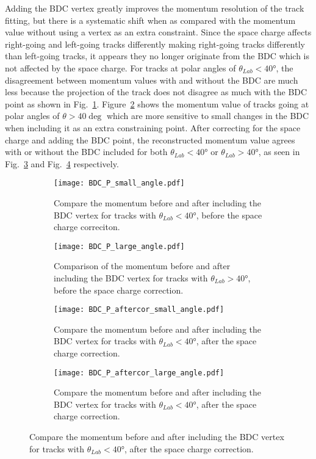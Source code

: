 Adding the BDC vertex greatly improves the momentum resolution of the track fitting, but there is a systematic shift when as compared with the momentum value without using a vertex as an extra constraint. Since the space charge affects right-going and left-going tracks differently making right-going tracks differently than left-going tracks, it appears they no longer originate from the BDC which is not affected by the space charge. For tracks at polar angles of $\theta_{Lab} < \ang{40}$, the disagreement between momentum values with and without the BDC are much less because the projection of the track does not disagree as much with the BDC point as shown in Fig.~\ref{fig:mom_S_before}. Figure~\ref{fig:mom_L_before} shows the momentum value of tracks going at polar angles of $\theta > 40 \deg$ which are more sensitive to small changes in the BDC when including it as an extra constraining point. After correcting for the space charge and adding the BDC point, the reconstructed momentum value agrees with or without the BDC included for both  $\theta_{Lab} < \ang{40}$ or $\theta_{Lab} > \ang{40}$, as seen in Fig.~\ref{fig:mom_S_after} and Fig.~\ref{fig:mom_L_after} respectively. 


\begin{figure}[!htb]
    \centering
    \begin{subfigure}[t]{0.45\textwidth}
        \centering
        \texttt{[image: BDC\_P\_small\_angle.pdf]} 
        \caption{Compare the momentum before and after including the BDC vertex for tracks with $\theta_{Lab} < \ang{40}$, before the space charge correciton.} \label{fig:mom_S_before}
    \end{subfigure}
    \hfill
    \begin{subfigure}[t]{0.45\textwidth}
        \centering
        \texttt{[image: BDC\_P\_large\_angle.pdf]} 
        \caption{Comparison of the momentum before and after including the BDC vertex for tracks with $\theta_{Lab} > \ang{40}$, before the space charge correction.} \label{fig:mom_L_before}
    \end{subfigure}
    
    \begin{subfigure}[t]{0.45\textwidth}
        \centering
        \texttt{[image: BDC\_P\_aftercor\_small\_angle.pdf]} 
        \caption{Compare the momentum before and after including the BDC vertex for tracks with $\theta_{Lab} < \ang{40}$, after the space charge correction. } \label{fig:mom_S_after}
    \end{subfigure}
    \hfill
    \begin{subfigure}[t]{0.45\textwidth}
        \centering
        \texttt{[image: BDC\_P\_aftercor\_large\_angle.pdf]} 
        \caption{Compare the momentum before and after including the BDC vertex for tracks with $\theta_{Lab} < \ang{40}$, after the space charge correction.} \label{fig:mom_L_after}
    \end{subfigure}
\label{fig:mom_sc}
\end{figure}



